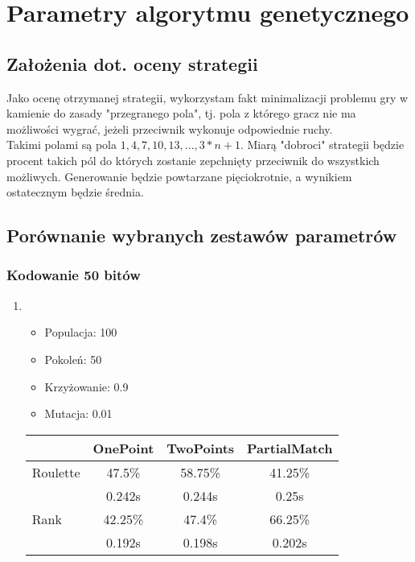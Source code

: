 \documentclass[a4paper,12pkt]{article}
\begin{document}
\section{Parametry algorytmu genetycznego}
\subsection{Założenia dot. oceny strategii}
Jako ocenę otrzymanej strategii, wykorzystam fakt minimalizacji problemu gry w kamienie do zasady "przegranego pola", tj. pola z którego gracz nie ma możliwości wygrać, jeżeli przeciwnik wykonuje odpowiednie ruchy.\\
Takimi polami są pola $1,4,7,10,13,...,3*n+1$. Miarą "dobroci" strategii będzie procent takich pól do których zostanie zepchnięty przeciwnik do wszystkich możliwych. Generowanie będzie powtarzane pięciokrotnie, a wynikiem ostatecznym będzie średnia.
\subsection{Porównanie wybranych zestawów parametrów}
\subsubsection{Kodowanie 50 bitów}
\begin{enumerate}
\item
\begin{itemize}
\item Populacja: 100
\item Pokoleń: 50
\item Krzyżowanie: 0.9
\item Mutacja: 0.01
\end{itemize}
\begin{tabular}{l|c|c|c}
&OnePoint&TwoPoints&PartialMatch\\ \hline
Roulette&47.5\%&58.75\%&41.25\%\\
&0.242s&0.244s&0.25s\\ \hline
Rank&42.25\%&47.4\%&66.25\%\\
&0.192s&0.198s&0.202s\\ \hline
\end{tabular}
\end{enumerate}
\end{document}
